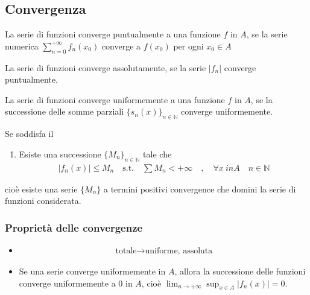 \documentclass[letterpaper,10pt,italian]{jupyterBook}
\begin{document}
\subsection{Convergenza}
\label{\detokenize{ch/series/series-functions-real:id1}}
\sphinxAtStartPar
{} La serie di funzioni converge puntualmente a una funzione \(f\) in \(A\), se la serie numerica \(\sum_{n=0}^{+\infty} f_n(x_0)\) converge a \(f(x_0)\) per ogni \(x_0 \in A\)

\sphinxAtStartPar
{} La serie di funzioni converge assolutamente, se la serie \(|f_n|\) converge puntualmente.

\sphinxAtStartPar
{} La serie di funzioni converge uniformemente a una funzione \(f\) in \(A\), se la successione delle somme parziali \(\{ s_n(x) \}_{n \in \mathbb{N}}\) converge uniformemente.

\sphinxAtStartPar
{} Se soddisfa il 
\begin{enumerate}
%
\item {} 
\sphinxAtStartPar
Esiste una successione \(\{ M_n \}_{n \in \mathbb{N}}\) tale che
\begin{equation*}
\begin{split}|f_n(x)| \le M_n \quad \text{s.t.} \quad \sum M_n < + \infty \quad , \quad \forall x \ in A \quad n \in \mathbb{N}\end{split}
\end{equation*}
\end{enumerate}

\sphinxAtStartPar
cioè esiste una serie \(\{ M_n \}\) a termini positivi convergence che domini la serie di funzioni considerata.


\subsubsection{Proprietà delle convergenze}
\label{\detokenize{ch/series/series-functions-real:proprieta-delle-convergenze}}\begin{itemize}
\item {} \begin{equation*}
\begin{split}\text{totale} \rightarrow \text{uniforme, assoluta}\end{split}
\end{equation*}
\item {} 
\sphinxAtStartPar
Se una serie converge uniformemente in \(A\), allora la successione delle funzioni converge uniformemente a \(0\) in \(A\), cioè \(\lim_{n \rightarrow +\infty} \sup_{x \in A} |f_n(x)| = 0\).

\end{itemize}
\end{document}
